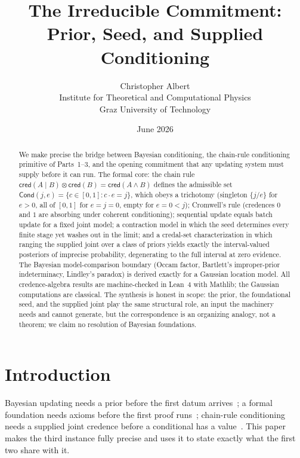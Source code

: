 \documentclass[11pt,a4paper]{article}
\title{The Irreducible Commitment:\\
Prior, Seed, and Supplied Conditioning}
\author{Christopher Albert\\
\small Institute for Theoretical and Computational Physics\\
\small Graz University of Technology}
\date{June 2026}
\newcommand{\cred}{\mathsf{cred}}
\newcommand{\conjc}{\otimes}
\newcommand{\Cond}{\mathsf{Cond}}
\begin{document}
\maketitle

\begin{abstract}
We make precise the bridge between Bayesian conditioning, the chain-rule
conditioning primitive of Parts~1--3, and the opening commitment that any
updating system must supply before it can run.
The formal core: the chain rule
$\cred(A \mid B) \conjc \cred(B) = \cred(A \land B)$ defines the
admissible set $\Cond(j,e) = \{c \in [0,1] : c \cdot e = j\}$, which
obeys a trichotomy (singleton $\{j/e\}$ for $e > 0$, all of $[0,1]$ for
$e = j = 0$, empty for $e = 0 < j$); Cromwell's rule (credences $0$ and
$1$ are absorbing under coherent conditioning); sequential update equals
batch update for a fixed joint model; a contraction model in which the
seed determines every finite stage yet washes out in the limit; and a
credal-set characterization in which ranging the supplied joint over a
class of priors yields exactly the interval-valued posteriors of
imprecise probability, degenerating to the full interval at zero
evidence.
The Bayesian model-comparison boundary (Occam factor, Bartlett's
improper-prior indeterminacy, Lindley's paradox) is derived exactly for
a Gaussian location model.
All credence-algebra results are machine-checked in Lean~4 with Mathlib;
the Gaussian computations are classical.
The synthesis is honest in scope: the prior, the foundational seed, and
the supplied joint play the same structural role, an input the machinery
needs and cannot generate, but the correspondence is an organizing
analogy, not a theorem; we claim no resolution of Bayesian foundations.
\end{abstract}

\section{Introduction}
\label{sec:intro}

Bayesian updating needs a prior before the first datum
arrives~\cite{ramsey1931,definetti1937,jaynes2003}; a formal foundation
needs axioms before the first proof runs~\cite{simpson2009}; chain-rule
conditioning needs a supplied joint credence before a conditional has a
value~\cite{part1}.
This paper makes the third instance fully precise and uses it to state
exactly what the first two share with it.
\end{document}
